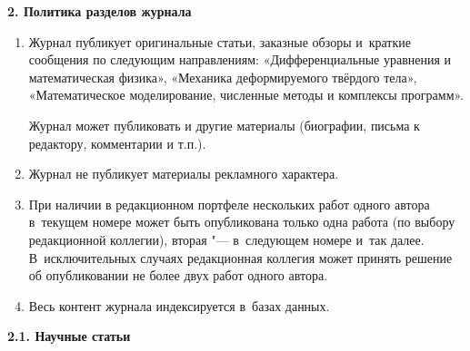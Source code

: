 \textbf{2. Политика разделов журнала}





\begin{enumerate}



\item[1.] Журнал публикует оригинальные статьи, заказные обзоры и~краткие сообщения по следующим направлениям: «Дифференциальные уравнения и математическая физика», «Механика деформируемого твёрдого тела», «Математическое моделирование, численные методы и комплексы программ».

Журнал может публиковать и другие материалы (биографии, письма к редактору, комментарии и т.п.).



\item[2.] 

Журнал не публикует материалы рекламного характера.

\item[3.] При наличии в редакционном портфеле нескольких работ одного автора в~текущем номере может быть опубликована только одна работа (по выбору редакционной коллегии), вторая "--- в~следующем номере и~так далее. В~исключительных случаях редакционная коллегия может принять решение об опубликовании не более двух работ одного автора. 

\item[4.] 

Весь контент журнала индексируется в~базах данных.



\end{enumerate}





\textbf{2.1. Научные статьи}



\hypertarget{sectionPoliciesOriginalArticles}{}



